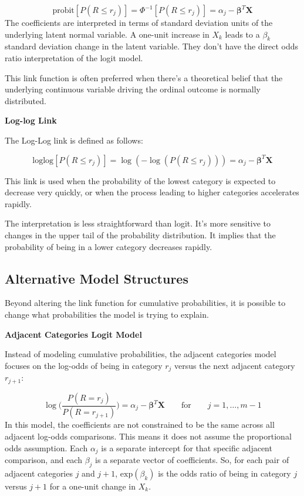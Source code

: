\documentclass[
  letterpaper,
  DIV=11,
  numbers=noendperiod]{scrartcl}
\begin{document}
\[
\text{probit}[P(R\leq r_j)] = \Phi^{-1}[P(R\leq r_j)] =  \alpha_j - \boldsymbol{\beta}^T\boldsymbol{X}
\] The coefficients are interpreted in terms of standard deviation units
of the underlying latent normal variable. A one-unit increase in \(X_k\)
leads to a \(\beta_k\) standard deviation change in the latent variable.
They don't have the direct odds ratio interpretation of the logit model.

This link function is often preferred when there's a theoretical belief
that the underlying continuous variable driving the ordinal outcome is
normally distributed.

\textbf{Log-log Link}

The Log-Log link is defined as follows:

\[
\text{loglog}[P(R\leq r_j)] =  \log(-\log(P(R\leq r_j))) =  \alpha_j - \boldsymbol{\beta}^T\boldsymbol{X}
\]

This link is used when the probability of the lowest category is
expected to decrease very quickly, or when the process leading to higher
categories accelerates rapidly.

The interpretation is less straightforward than logit. It's more
sensitive to changes in the upper tail of the probability distribution.
It implies that the probability of being in a lower category decreases
rapidly.

\hypertarget{alternative-model-structures}{%
\subsection{Alternative Model
Structures}\label{alternative-model-structures}}

Beyond altering the link function for cumulative probabilities, it is
possible to change what probabilities the model is trying to explain.

\textbf{Adjacent Categories Logit Model}

Instead of modeling cumulative probabilities, the adjacent categories
model focuses on the log-odds of being in category \(r_j\) versus the
next adjacent category \(r_{j+1}\):

\[
\log \Bigg(\frac{P(R = r_j)}{P(R = r_{j+1})}\Bigg) = \alpha_j - \boldsymbol{\beta}^T\boldsymbol{X} \qquad \text{for} \qquad j = 1,\dots,m-1
\] In this model, the coefficients are not constrained to be the same
across all adjacent log-odds comparisons. This means it does not assume
the proportional odds assumption. Each \(\alpha_j\) is a separate
intercept for that specific adjacent comparison, and each \(\beta_j\) is
a separate vector of coefficients. So, for each pair of adjacent
categories \(j\) and \(j+1\), \(\text{exp}(\beta_k)\) is the odds ratio
of being in category \(j\) versus \(j+1\) for a one-unit change in
\(X_k\).
\end{document}

